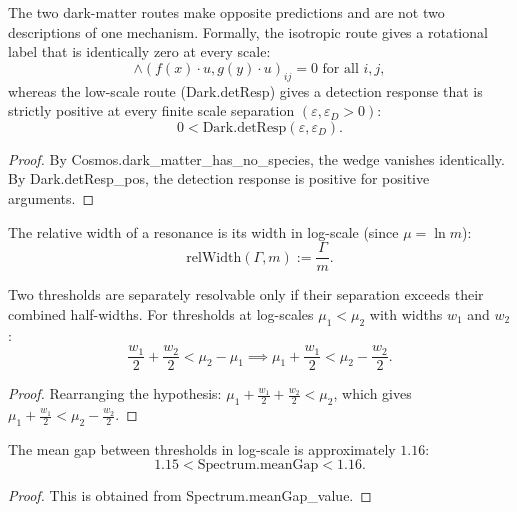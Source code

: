 \begin{theorem}
The two dark-matter routes make opposite predictions and are not two descriptions of one mechanism.  Formally, the isotropic route gives a rotational label that is identically zero at every scale:
\begin{equation}
\wedge(f(x) \cdot u, g(y) \cdot u)_{ij} = 0 \text{ for all } i, j,
\end{equation}
whereas the low-scale route (Dark.detResp) gives a detection response that is strictly positive at every finite scale separation $(\varepsilon, \varepsilon_D > 0)$:
\begin{equation}
0 < \text{Dark.detResp}(\varepsilon, \varepsilon_D).
\end{equation}
\begin{proof}
By Cosmos.dark\_matter\_has\_no\_species, the wedge vanishes identically. By Dark.detResp\_pos, the detection response is positive for positive arguments.
\end{proof}
\end{theorem}

\begin{definition}
The relative width of a resonance is its width in log-scale (since $\mu = \ln m$):
\begin{equation}
\text{relWidth}(\Gamma, m) := \frac{\Gamma}{m}.
\end{equation}
\end{definition}

\begin{theorem}
Two thresholds are separately resolvable only if their separation exceeds their combined half-widths.  For thresholds at log-scales $\mu_1 < \mu_2$ with widths $w_1$ and $w_2$:
\begin{equation}
\frac{w_1}{2} + \frac{w_2}{2} < \mu_2 - \mu_1 \implies \mu_1 + \frac{w_1}{2} < \mu_2 - \frac{w_2}{2}.
\end{equation}
\begin{proof}
Rearranging the hypothesis: $\mu_1 + \frac{w_1}{2} + \frac{w_2}{2} < \mu_2$, which gives $\mu_1 + \frac{w_1}{2} < \mu_2 - \frac{w_2}{2}$.
\end{proof}
\end{theorem}

\begin{theorem}
The mean gap between thresholds in log-scale is approximately $1.16$:
\begin{equation}
1.15 < \text{Spectrum.meanGap} < 1.16.
\end{equation}
\begin{proof}
This is obtained from Spectrum.meanGap\_value.
\end{proof}
\end{theorem}

